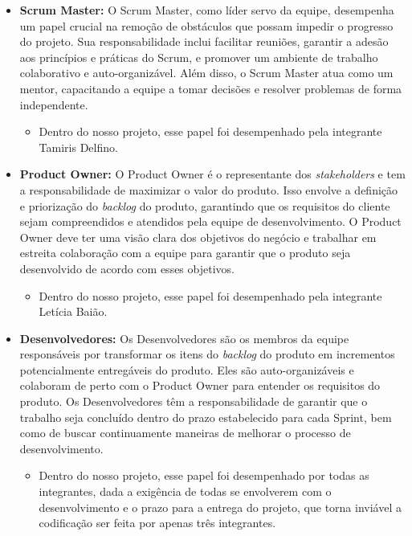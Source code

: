 \begin{itemize}
    \item \textbf{Scrum Master:}
O Scrum Master, como líder servo da equipe, desempenha um papel crucial na remoção de obstáculos que possam impedir o progresso do projeto. Sua responsabilidade inclui facilitar reuniões, garantir a adesão aos princípios e práticas do Scrum, e promover um ambiente de trabalho colaborativo e auto-organizável. Além disso, o Scrum Master atua como um mentor, capacitando a equipe a tomar decisões e resolver problemas de forma independente. 
    \begin{itemize}
        \item Dentro do nosso projeto, esse papel foi desempenhado pela integrante Tamiris Delfino.
    \end{itemize}
    
    \item \textbf{Product Owner:}
O Product Owner é o representante dos \textit{stakeholders} e tem a responsabilidade de maximizar o valor do produto. Isso envolve a definição e priorização do \textit{backlog} do produto, garantindo que os requisitos do cliente sejam compreendidos e atendidos pela equipe de desenvolvimento. O Product Owner deve ter uma visão clara dos objetivos do negócio e trabalhar em estreita colaboração com a equipe para garantir que o produto seja desenvolvido de acordo com esses objetivos.
\begin{itemize}
        \item Dentro do nosso projeto, esse papel foi desempenhado pela integrante Letícia Baião.
    \end{itemize}

    \item \textbf{Desenvolvedores:} 
Os Desenvolvedores são os membros da equipe responsáveis por transformar os itens do \textit{backlog} do produto em incrementos potencialmente entregáveis do produto. Eles são auto-organizáveis e colaboram de perto com o Product Owner para entender os requisitos do produto. Os Desenvolvedores têm a responsabilidade de garantir que o trabalho seja concluído dentro do prazo estabelecido para cada Sprint, bem como de buscar continuamente maneiras de melhorar o processo de desenvolvimento.
    \begin{itemize}
        \item Dentro do nosso projeto, esse papel foi desempenhado por todas as integrantes, dada a exigência de todas se envolverem com o desenvolvimento e o prazo para a entrega do projeto, que torna inviável a codificação ser feita por apenas três integrantes.
    \end{itemize}
\end{itemize}

